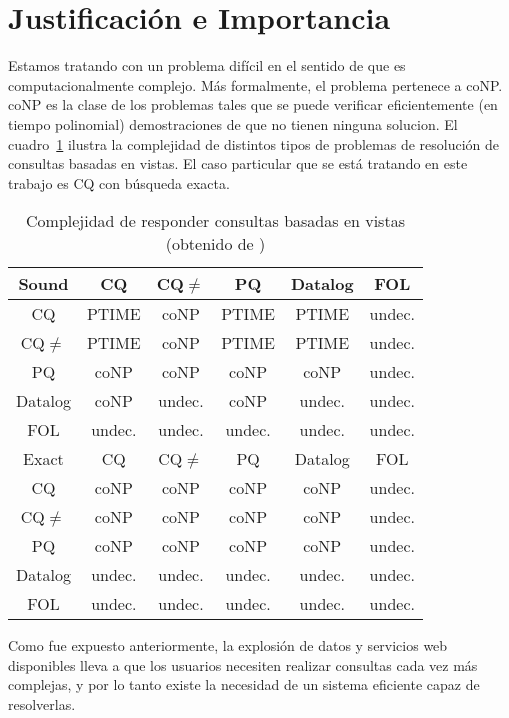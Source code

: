 \section{Justificación e Importancia}

Estamos tratando con un problema difícil \cite{lenzerini:dataintegration} en el
sentido de que es computacionalmente complejo. Más formalmente, el problema
pertenece a coNP.
coNP es la clase de los problemas tales que se puede verificar eficientemente (en
tiempo polinomial) demostraciones de que no tienen ninguna solucion.
El cuadro~\ref{cqcomplexity}
ilustra la complejidad de distintos tipos de
problemas de resolución de consultas basadas en vistas. El caso particular que
se está tratando en este trabajo es CQ con búsqueda exacta.

\begin{table}
\begin{center}
  \begin{tabular}{|c||c|c|c|c|c|}
\hline
Sound  &  CQ  & CQ$\neq$  & PQ  &Datalog &FOL \\
\hline
  CQ  & PTIME &coNP  &PTIME &PTIME  &undec. \\
 CQ$\neq$  & PTIME &coNP  &PTIME &PTIME  &undec. \\
  PQ  &  coNP &coNP  & coNP & coNP  &undec. \\
Datalog &coNP &undec.& coNP &undec. &undec. \\
 FOL  & undec.&undec.&undec.&undec. &undec. \\
\hline
 Exact  & CQ &  CQ$\neq$     &  PQ  &Datalog &FOL \\
\hline
  CQ    &coNP &coNP  & coNP & coNP  &undec. \\
 CQ$\neq$    &coNP &coNP  & coNP & coNP  &undec. \\
  PQ    &coNP &coNP  & coNP & coNP  &undec. \\
Datalog&undec.&undec.&undec.&undec. &undec. \\
 FOL   &undec.&undec.&undec.&undec. &undec. \\
\hline
  \end{tabular}
  \caption{Complejidad de responder consultas basadas en vistas (obtenido de
\cite{lenzerini:dataintegration})}
  \label{cqcomplexity}
\end{center}
\end{table}

Como fue expuesto anteriormente, la explosión de datos y servicios web
disponibles lleva a que los usuarios necesiten realizar consultas cada vez más
complejas, y por lo tanto existe la necesidad de un sistema eficiente capaz de
resolverlas.
